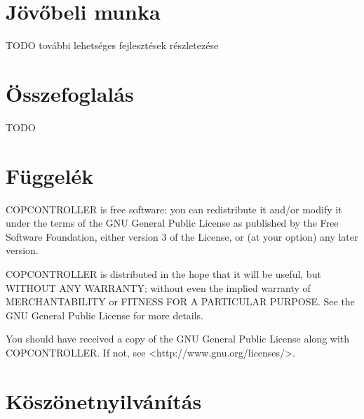 \documentclass[a4paper,12pt]{report}
\begin{document}
\newpage
\chapter{Jövőbeli munka}
\label{futureworks}

TODO további lehetséges fejlesztések részletezése

\newpage
\chapter{Összefoglalás}
\label{summary}

TODO

\newpage
{}

\begin{singlespace}

\end{singlespace}

\chapter*{Függelék}

\noindent
COPCONTROLLER is free software: you can redistribute it and/or modify
it under the terms of the GNU General Public License as published by
the Free Software Foundation, either version 3 of the License, or
(at your option) any later version.

\noindent
COPCONTROLLER is distributed in the hope that it will be useful,
but WITHOUT ANY WARRANTY; without even the implied warranty of
MERCHANTABILITY or FITNESS FOR A PARTICULAR PURPOSE.  See the
GNU General Public License for more details.

\noindent
You should have received a copy of the GNU General Public License
along with COPCONTROLLER. If not, see <http://www.gnu.org/licenses/>.

\chapter*{Köszönetnyilvánítás}
\end{document}
